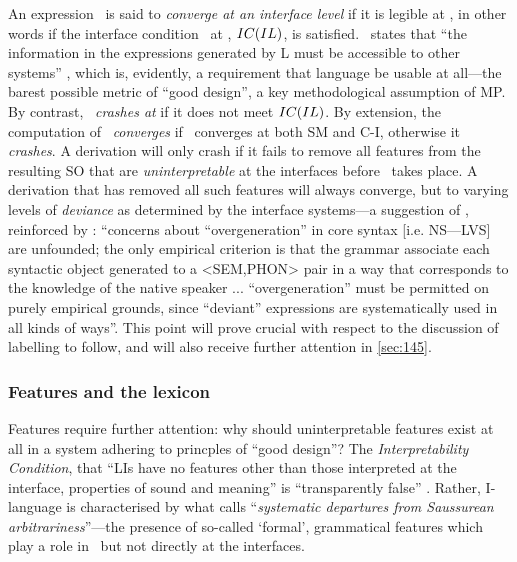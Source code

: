 An expression \Exp\ is said to \textit{converge at an interface level \IL} if it is legible at \IL, in other words if the interface condition \IC\ at \IL, $IC(IL)$, is satisfied. \IC\ states that ``the information in the expressions generated by L must be accessible to other systems'' \parencite[106]{ChomskyN_2004}, which is, evidently, a requirement that language be usable at all---the barest possible metric of ``good design'', a key methodological assumption of MP. By contrast, \Exp\ \textit{crashes at \IL} if it does not meet $IC(IL)$. By extension, the computation of \Exp\ \textit{converges} if \Exp\ converges at both SM and C-I, otherwise it \textit{crashes}. A derivation will only crash if it fails to remove all features from the resulting SO that are \textit{uninterpretable} at the interfaces before \TRANSFER\ takes place. A derivation that has removed all such features will always converge, but to varying levels of \textit{deviance} as determined by the interface systems---a suggestion of \textcite[112]{ChomskyN_2004}, reinforced by \textcite[238]{ChomskyN.etal_2019}: ``concerns about ``overgeneration'' in core syntax [i.e. NS---LVS] are unfounded; the only empirical criterion is that the grammar associate each syntactic object generated to a <SEM,PHON> pair in a way that corresponds to the knowledge of the native speaker ... ``overgeneration'' must be permitted on purely empirical grounds, since ``deviant'' expressions are systematically used in all kinds of ways''. This point will prove crucial with respect to the discussion of labelling to follow, and will also receive further attention in \autoref{sec:145}.

\subsubsection{Features and the lexicon}\label{sec:143}

Features require further attention: why should uninterpretable features exist at all in a system adhering to princples of ``good design''? The \textit{Interpretability Condition}, that ``LIs have no features other than those interpreted at the interface, properties of sound and meaning'' is ``transparently false'' \parencite[113]{ChomskyN_2000}. Rather, I-language is characterised by what \textcite[54]{BiberauerT_2019} calls ``\textit{systematic departures from Saussurean arbitrariness}''---the presence of so-called `formal', grammatical features which play a role in \CHL\ but not directly at the interfaces.

